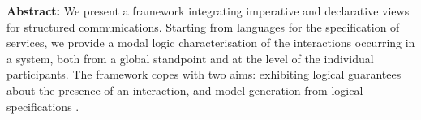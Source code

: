 {\large\textbf{Abstract:}} 
We present a framework integrating  imperative and declarative views
for structured communications. Starting from languages for the
specification of services, we provide a modal logic characterisation
of the interactions occurring in a system, both from a global
standpoint and at the level of the individual participants. The framework copes
with two aims: exhibiting logical guarantees about the presence of an
interaction, and model generation from logical specifications
.



